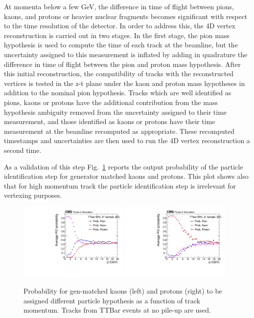 At momenta below a few GeV, the difference in time of flight between pions, kaons, and protons or heavier nuclear fragments becomes significant with respect to the time resolution of the detector.  In order to address this, the 4D vertex reconstruction is carried out in two stages.  In the first stage, the pion mass hypothesis is used to compute the time of each track at the beamline, but the uncertainty assigned to this measurement is inflated by adding in quadrature the difference in time of flight between the pion and proton mass hypothesis.  After this initial reconstruction, the compatibility of tracks with the reconstructed vertices is tested in the z-t plane under the kaon and proton mass hypotheses in addition to the nominal pion hypothesis.  Tracks which are well identified as pions, kaons or protons have the additional contribution from the mass hypothesis ambiguity removed from the uncertainty assigned to their time measurement, and those identified as kaons or protons have their time measurement at the beamline recomputed as appropriate.  These recomputed timestamps and uncertainties are then used to run the 4D vertex reconstruction a second time.

As a validation of this step Fig.~\ref{fig:tofpid_probability} reports the output probability of the particle identification step for generator matched kaons and protons. This plot shows also that for high momentum track the particle identification step is irrelevant for vertexing purposes.

\begin{figure}[!hbtp]
\centering
\includegraphics[width=0.48\textwidth]{fig/performance/4dvtx/kaons_PID_prob_vs_p_BTL.pdf}
\includegraphics[width=0.48\textwidth]{fig/performance/4dvtx/protons_PID_prob_vs_p_BTL.pdf}
\caption{Probability for gen-matched kaons (left) and protons (right) to be assigned  different particle hypothesis as a function of track momentum. Tracks from TTBar events at no pile-up are used.}
\label{fig:tofpid_probability}
\end{figure}

